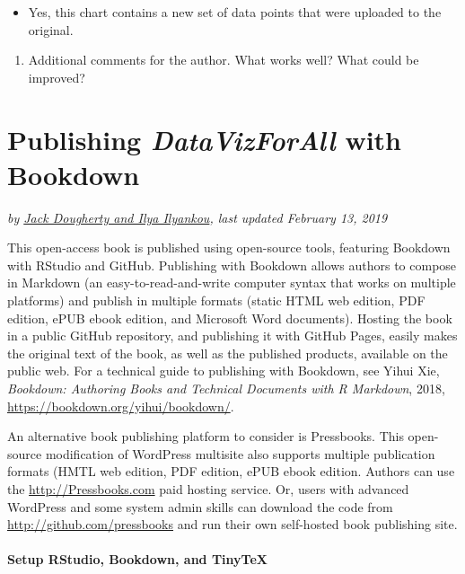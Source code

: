 \documentclass[
  english,
]{book}
\providecommand{\tightlist}{%
  \setlength{\itemsep}{0pt}\setlength{\parskip}{0pt}}
\begin{document}
\begin{itemize}
\tightlist
\item
  Yes, this chart contains a new set of data points that were uploaded to the original.
\end{itemize}

\begin{enumerate}
\def\labelenumi{\arabic{enumi}.}
\setcounter{enumi}{5}
\tightlist
\item
  Additional comments for the author. What works well? What could be improved?
\end{enumerate}

\hypertarget{bookdown}{%
\chapter{\texorpdfstring{Publishing \emph{DataVizForAll} with Bookdown}{Publishing DataVizForAll with Bookdown}}\label{bookdown}}

\emph{by \href{authors}{Jack Dougherty and Ilya Ilyankou}, last updated February 13, 2019}

This open-access book is published using open-source tools, featuring Bookdown with RStudio and GitHub. Publishing with Bookdown allows authors to compose in Markdown (an easy-to-read-and-write computer syntax that works on multiple platforms) and publish in multiple formats (static HTML web edition, PDF edition, ePUB ebook edition, and Microsoft Word documents). Hosting the book in a public GitHub repository, and publishing it with GitHub Pages, easily makes the original text of the book, as well as the published products, available on the public web. For a technical guide to publishing with Bookdown, see Yihui Xie, \emph{Bookdown: Authoring Books and Technical Documents with R Markdown}, 2018, \url{https://bookdown.org/yihui/bookdown/}.

An alternative book publishing platform to consider is Pressbooks. This open-source modification of WordPress multisite also supports multiple publication formats (HMTL web edition, PDF edition, ePUB ebook edition. Authors can use the \url{http://Pressbooks.com} paid hosting service. Or, users with advanced WordPress and some system admin skills can download the code from \url{http://github.com/pressbooks} and run their own self-hosted book publishing site.

\hypertarget{setup-rstudio-bookdown-and-tinytex}{%
\subsubsection*{Setup RStudio, Bookdown, and TinyTeX}\label{setup-rstudio-bookdown-and-tinytex}}
\end{document}
